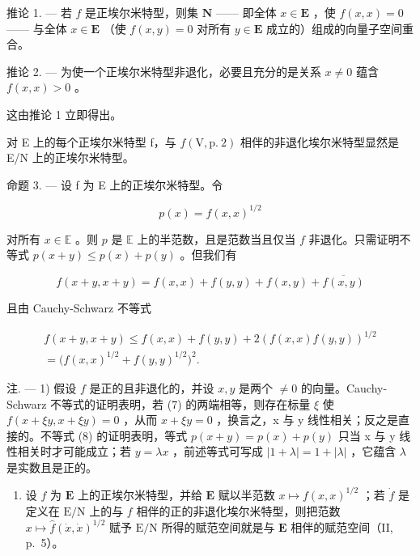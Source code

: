 推论 1. --- 若 \(f\) 是正埃尔米特型，则集 \(\mathbf{N}\) —— 即全体 \(x \in \mathbf{E}\) ，使 \(f(x, x) = 0\) —— 与全体 \(x \in \mathbf{E}\) （使 \(f(x, y) = 0\) 对所有 \(y \in \mathbf{E}\) 成立的）组成的向量子空间重合。

推论 2. --- 为使一个正埃尔米特型非退化，必要且充分的是关系 \(x \neq 0\) 蕴含 \(f(x, x) > 0\) 。

这由推论 1 立即得出。

对 E 上的每个正埃尔米特型 f，与 \(f(\mathrm{V}, \mathrm{p.~2})\) 相伴的非退化埃尔米特型显然是 E/N 上的正埃尔米特型。

命题 3. --- 设 f 为 E 上的正埃尔米特型。令

\[
p (x) = f (x, x) ^ {1 / 2}
\]

对所有 \(x \in \mathbb{E}\) 。则 \(p\) 是 \(\mathbb{E}\) 上的半范数，且是范数当且仅当 \(f\) 非退化。只需证明不等式 \(p(x + y) \leqslant p(x) + p(y)\) 。但我们有

\[
f (x + y, x + y) = f (x, x) + f (y, y) + f (x, y) + \overline {{f (x , y)}}
\]

且由 Cauchy-Schwarz 不等式

\[
\begin{array}{c} f (x + y, x + y) \leqslant f (x, x) + f (y, y) + 2 (f (x, x) f (y, y)) ^ {1 / 2} \\ = \bigl (f (x, x) ^ {1 / 2} + f (y, y) ^ {1 / 2} \bigr) ^ {2}. \end{array}\tag{8}
\]

注. --- 1) 假设 \(f\) 是正的且非退化的，并设 \(x, y\) 是两个 \(\neq 0\) 的向量。Cauchy-Schwarz 不等式的证明表明，若 (7) 的两端相等，则存在标量 \(\xi\) 使 \(f(x + \xi y, x + \xi y) = 0\) ，从而 \(x + \xi y = 0\) ，换言之，x 与 y 线性相关；反之是直接的。不等式 (8) 的证明表明，等式 \(p(x + y) = p(x) + p(y)\) 只当 x 与 y 线性相关时才可能成立；若 \(y = \lambda x\) ，前述等式可写成 \(|1 + \lambda| = 1 + |\lambda|\) ，它蕴含 \(\lambda\) 是实数且是正的。

\begin{enumerate}
\def\labelenumi{\arabic{enumi})}
\setcounter{enumi}{1}
\tightlist
\item
  设 \(f\) 为 \(\mathbf{E}\) 上的正埃尔米特型，并给 \(\mathbf{E}\) 赋以半范数 \(x \mapsto f(x, x)^{1/2}\) ；若 \(\dot{f}\) 是定义在 \(\mathrm{E/N}\) 上的与 \(f\) 相伴的正的非退化埃尔米特型，则把范数 \(x \mapsto \hat{f}(\dot{x}, \dot{x})^{1/2}\) 赋予 \(\mathrm{E/N}\) 所得的赋范空间就是与 \(\mathbf{E}\) 相伴的赋范空间（II, p.~5）。
\end{enumerate}


